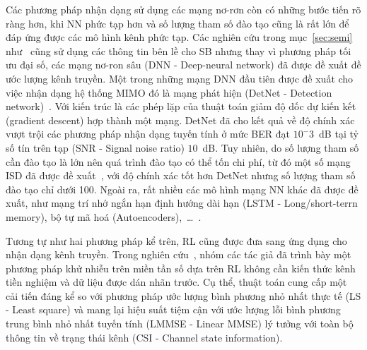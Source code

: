 Các phương pháp nhận dạng sử dụng các mạng nơ-rơn còn có những bước tiến rõ ràng hơn, khi NN phức tạp hơn và số lượng tham số đào tạo cũng là rất lớn để đáp ứng được các mô hình kênh phức tạp. Các nghiên cứu trong mục~\ref{sec:semi} như~\cite{Lin2020, Wan2008} cũng sử dụng các thông tin bên lề cho SB nhưng thay vì phương pháp tối ưu đại số, các mạng nơ-ron sâu (DNN - Deep-neural network) đã được đề xuất đề ước lượng kênh truyền. Một trong những mạng DNN đầu tiên được đề xuất cho việc nhận dạng hệ thống MIMO đó là mạng phát hiện (DetNet - Detection network)~\cite{Samuel2019}. Với kiến trúc là các phép lặp của thuật toán giảm độ dốc dự kiến kết (gradient descent) hợp thành một mạng. DetNet đã cho kết quả về độ chính xác vượt trội các phương pháp nhận dạng tuyến tính ở mức BER đạt $10^-3$~dB tại tỷ số tín trên tạp (SNR - Signal noise ratio) $10$~dB. Tuy nhiên, do số lượng tham số cần đào tạo là lớn nên quá trình đào tạo có thể tốn chi phí, từ đó một số mạng ISD đã được đề xuất~\cite{Mandloi2017, Liao2020}, với độ chính xác tốt hơn DetNet nhưng số lượng tham số đào tạo chỉ dưới 100. Ngoài ra, rất nhiều các mô hình mạng NN khác đã được đề xuất, như mạng trí nhớ ngắn hạn định hướng dài hạn  (LSTM - Long/short-terrn memory), bộ tự mã hoá (Autoencoders),~\ldots~\cite{vilas2022}.

Tương tự như hai phương pháp kể trên, RL cũng được đưa sang ứng dụng cho nhận dạng kênh truyền. Trong nghiên cứu~\cite{Oh2021}, nhóm các tác giả đã trình bày một phương pháp khử nhiễu trên miền tần số dựa trên RL không cần kiến thức kênh tiền nghiệm và dữ liệu được dán nhãn trước. Cụ thể, thuật toán cung cấp một cải tiến đáng kể so với phương pháp ước lượng bình phương nhỏ nhất thực tế (LS - Least square) và mang lại hiệu suất tiệm cận với ước lượng lỗi bình phương trung bình nhỏ nhất tuyến tính (LMMSE - Linear MMSE) lý tưởng với toàn bộ thông tin về trạng thái kênh (CSI - Channel state information).